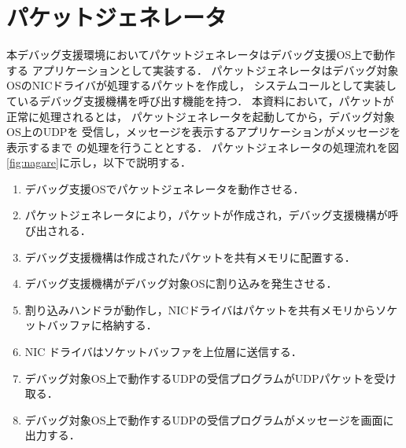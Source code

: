 \documentclass[12pt]{jsarticle}
\begin{document}
\section{パケットジェネレータ}
本デバッグ支援環境においてパケットジェネレータはデバッグ支援OS上で動作する
アプリケーションとして実装する．
パケットジェネレータはデバッグ対象OSのNICドライバが処理するパケットを作成し，
システムコールとして実装しているデバッグ支援機構を呼び出す機能を持つ．
本資料において，パケットが正常に処理されるとは，
パケットジェネレータを起動してから，デバッグ対象OS上のUDPを
受信し，メッセージを表示するアプリケーションがメッセージを表示するまで
の処理を行うこととする．
パケットジェネレータの処理流れを図\ref{fig:nagare}に示し，以下で説明する．
\begin{enumerate}
    \item デバッグ支援OSでパケットジェネレータを動作させる．
    \item パケットジェネレータにより，パケットが作成され，デバッグ支援機構が呼び出される．
    \item デバッグ支援機構は作成されたパケットを共有メモリに配置する．
    \item デバッグ支援機構がデバッグ対象OSに割り込みを発生させる．
    \item 割り込みハンドラが動作し，NICドライバはパケットを共有メモリからソケットバッファに格納する．
    \item NIC ドライバはソケットバッファを上位層に送信する．
    \item デバッグ対象OS上で動作するUDPの受信プログラムがUDPパケットを受け取る．
    \item デバッグ対象OS上で動作するUDPの受信プログラムがメッセージを画面に出力する．
\end{enumerate}
\end{document}
